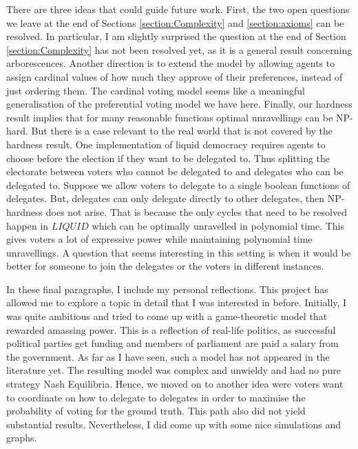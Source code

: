 \documentclass[11pt,a4paper, titlepage]{article}
\theoremstyle{definition}
\newcommand{\LIQUID}{\mathit{LIQUID}}
\begin{document}
There are three ideas that could guide future work. First, the two open questions we leave at the end of Sections \ref{section:Complexity} and \ref{section:axioms} can be resolved. In particular, I am slightly surprised the question at the end of Section \ref{section:Complexity} has not been resolved yet, as it is a general result concerning arborescences.
Another direction is to extend the model by allowing agents to assign cardinal values of how much they approve of their preferences, instead of just ordering them.
The cardinal voting model seems like a meaningful generalisation of the preferential voting model we have here.
Finally, our hardness result implies that for many reasonable functions optimal unravellings can be NP-hard.
But there is a case relevant to the real world that is not covered by the hardness result.
One implementation of liquid democracy requires agents to choose before the election if they want to be delegated to.
Thus splitting the electorate between voters who cannot be delegated to and delegates who can be delegated to. 
Suppose we allow voters to delegate to a single boolean functions of delegates. 
But, delegates can only delegate directly to other delegates, then NP-hardness does not arise.
That is because the only cycles that need to be resolved happen in $\LIQUID$ which can be optimally unravelled in polynomial time.
This gives voters a lot of expressive power while maintaining polynomial time unravellings. 
A question that seems interesting in this setting is when it would be better for someone to join the delegates or the voters in different instances.

In these final paragraphs, I include my personal reflections.
This project has allowed me to explore a topic in detail that I was interested in before.
Initially, I was quite ambitious and tried to come up with a game-theoretic model that rewarded amassing power.
This is a reflection of real-life politics, as successful political parties get funding and members of parliament are paid a salary from the government.
As far as I have seen, such a model has not appeared in the literature yet.
The resulting model was complex and unwieldy and had no pure strategy Nash Equilibria.
Hence, we moved on to another idea were voters want to coordinate on how to delegate to delegates in order to maximise the probability of voting for the ground truth.
This path also did not yield substantial results. Nevertheless, I did come up with some nice simulations and graphs.
\end{document}
